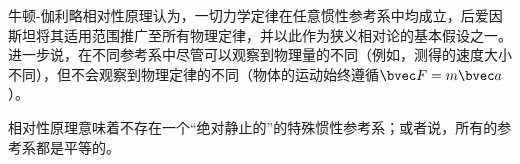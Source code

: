 
\begin{issues}
\issueDraft
\end{issues}


牛顿-伽利略相对性原理认为，一切力学定律在任意惯性参考系中均成立，后爱因斯坦将其适用范围推广至所有物理定律，并以此作为狭义相对论的基本假设之一。进一步说，在不同参考系中尽管可以观察到物理量的不同（例如，测得的速度大小不同），但不会观察到物理定律的不同（物体的运动始终遵循$\bvec F=m \bvec a$）。

相对性原理意味着不存在一个“绝对静止的”的特殊惯性参考系；或者说，所有的参考系都是平等的。
